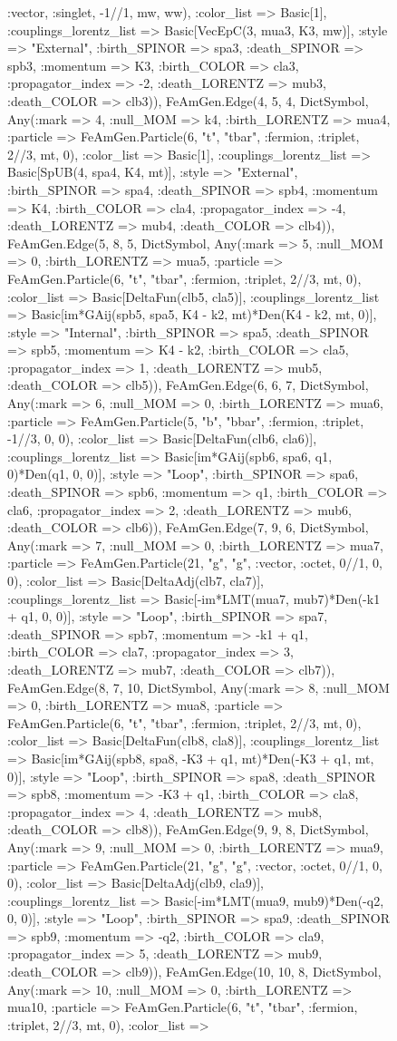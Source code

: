 \documentclass{revtex4}
\begin{document}
\begin{figure}[!htb]
\begin{center}
{:vector, :singlet, -1//1, mw, ww), :color_list => Basic[1], :couplings_lorentz_list => Basic[VecEpC(3, mua3, K3, mw)], :style => "External", :birth_SPINOR => spa3, :death_SPINOR => spb3, :momentum => K3, :birth_COLOR => cla3, :propagator_index => -2, :death_LORENTZ => mub3, :death_COLOR => clb3)), FeAmGen.Edge(4, 5, 4, Dict{Symbol, Any}(:mark => 4, :null_MOM => k4, :birth_LORENTZ => mua4, :particle => FeAmGen.Particle(6, "t", "tbar", :fermion, :triplet, 2//3, mt, 0), :color_list => Basic[1], :couplings_lorentz_list => Basic[SpUB(4, spa4, K4, mt)], :style => "External", :birth_SPINOR => spa4, :death_SPINOR => spb4, :momentum => K4, :birth_COLOR => cla4, :propagator_index => -4, :death_LORENTZ => mub4, :death_COLOR => clb4)), FeAmGen.Edge(5, 8, 5, Dict{Symbol, Any}(:mark => 5, :null_MOM => 0, :birth_LORENTZ => mua5, :particle => FeAmGen.Particle(6, "t", "tbar", :fermion, :triplet, 2//3, mt, 0), :color_list => Basic[DeltaFun(clb5, cla5)], :couplings_lorentz_list => Basic[im*GAij(spb5, spa5, K4 - k2, mt)*Den(K4 - k2, mt, 0)], :style => "Internal", :birth_SPINOR => spa5, :death_SPINOR => spb5, :momentum => K4 - k2, :birth_COLOR => cla5, :propagator_index => 1, :death_LORENTZ => mub5, :death_COLOR => clb5)), FeAmGen.Edge(6, 6, 7, Dict{Symbol, Any}(:mark => 6, :null_MOM => 0, :birth_LORENTZ => mua6, :particle => FeAmGen.Particle(5, "b", "bbar", :fermion, :triplet, -1//3, 0, 0), :color_list => Basic[DeltaFun(clb6, cla6)], :couplings_lorentz_list => Basic[im*GAij(spb6, spa6, q1, 0)*Den(q1, 0, 0)], :style => "Loop", :birth_SPINOR => spa6, :death_SPINOR => spb6, :momentum => q1, :birth_COLOR => cla6, :propagator_index => 2, :death_LORENTZ => mub6, :death_COLOR => clb6)), FeAmGen.Edge(7, 9, 6, Dict{Symbol, Any}(:mark => 7, :null_MOM => 0, :birth_LORENTZ => mua7, :particle => FeAmGen.Particle(21, "g", "g", :vector, :octet, 0//1, 0, 0), :color_list => Basic[DeltaAdj(clb7, cla7)], :couplings_lorentz_list => Basic[-im*LMT(mua7, mub7)*Den(-k1 + q1, 0, 0)], :style => "Loop", :birth_SPINOR => spa7, :death_SPINOR => spb7, :momentum => -k1 + q1, :birth_COLOR => cla7, :propagator_index => 3, :death_LORENTZ => mub7, :death_COLOR => clb7)), FeAmGen.Edge(8, 7, 10, Dict{Symbol, Any}(:mark => 8, :null_MOM => 0, :birth_LORENTZ => mua8, :particle => FeAmGen.Particle(6, "t", "tbar", :fermion, :triplet, 2//3, mt, 0), :color_list => Basic[DeltaFun(clb8, cla8)], :couplings_lorentz_list => Basic[im*GAij(spb8, spa8, -K3 + q1, mt)*Den(-K3 + q1, mt, 0)], :style => "Loop", :birth_SPINOR => spa8, :death_SPINOR => spb8, :momentum => -K3 + q1, :birth_COLOR => cla8, :propagator_index => 4, :death_LORENTZ => mub8, :death_COLOR => clb8)), FeAmGen.Edge(9, 9, 8, Dict{Symbol, Any}(:mark => 9, :null_MOM => 0, :birth_LORENTZ => mua9, :particle => FeAmGen.Particle(21, "g", "g", :vector, :octet, 0//1, 0, 0), :color_list => Basic[DeltaAdj(clb9, cla9)], :couplings_lorentz_list => Basic[-im*LMT(mua9, mub9)*Den(-q2, 0, 0)], :style => "Loop", :birth_SPINOR => spa9, :death_SPINOR => spb9, :momentum => -q2, :birth_COLOR => cla9, :propagator_index => 5, :death_LORENTZ => mub9, :death_COLOR => clb9)), FeAmGen.Edge(10, 10, 8, Dict{Symbol, Any}(:mark => 10, :null_MOM => 0, :birth_LORENTZ => mua10, :particle => FeAmGen.Particle(6, "t", "tbar", :fermion, :triplet, 2//3, mt, 0), :color_list => }
\end{center}
\end{figure}
\end{document}
